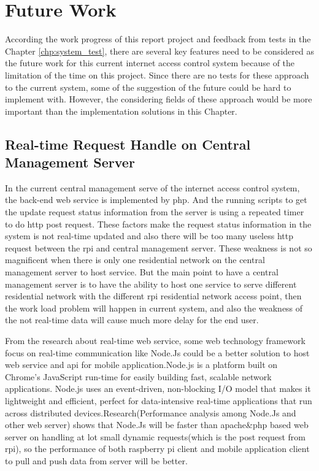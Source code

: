 \chapter{Future Work}
\label{chp:future_work}

\par According the work progress of this report project and feedback from tests in the Chapter \ref{chp:system_test}, there are several key features need to be considered as the future work for this current internet access control system because of the limitation of the time on this project. Since there are no tests for these approach to the current system, some of the suggestion of the future could be hard to implement with. However, the considering fields of these approach would be more important than the implementation solutions in this Chapter.

\section{Real-time Request Handle on Central Management Server}
\par In the current central management serve of the internet access control system, the back-end web service is implemented by \gls{php}. And the running scripts to get the update request status information from the server is using a repeated timer to do \gls{http} post request. These factors make the request status information in the system is not real-time updated and also there will be too many useless \gls{http} request between the \gls{rpi} and central management server. These weakness is not so magnificent when there is only one residential network on the central management server to host service. But the main point to have a central management server is to have the ability to host one service to serve different residential network with the different \gls{rpi} residential network access point, then the work load problem will happen in current system, and also the weakness of the not real-time data will cause much more delay for the end user.
\par From the research about real-time web service, some web technology framework focus on real-time communication like Node.Js\cite{nodejs} could be a better solution to host web service and \gls{api} for mobile application.Node.js is a platform built on Chrome's JavaScript run-time for easily building fast, scalable network applications. Node.js uses an event-driven, non-blocking I/O model that makes it lightweight and efficient, perfect for data-intensive real-time applications that run across distributed devices.Research(Performance analysis among Node.Js and other web server)\cite{jsconf2010} shows that Node.Js will be faster than apache\&php based web server on handling at lot small dynamic requests(which is the post request from \gls{rpi}), so the performance of both raspberry pi client and mobile application client to pull and push data from server will be better.


